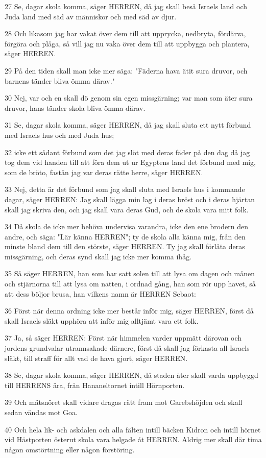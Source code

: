 \par 27 Se, dagar skola komma, säger HERREN, då jag skall beså Israels land och Juda land med säd av människor och med säd av djur.
\par 28 Och likasom jag har vakat över dem till att upprycka, nedbryta, fördärva, förgöra och plåga, så vill jag nu vaka över dem till att uppbygga och plantera, säger HERREN.
\par 29 På den tiden skall man icke mer säga: "Fäderna hava ätit sura druvor, och barnens tänder bliva ömma därav."
\par 30 Nej, var och en skall dö genom sin egen missgärning; var man som äter sura druvor, hans tänder skola bliva ömma därav.
\par 31 Se, dagar skola komma, säger HERREN, då jag skall sluta ett nytt förbund med Israels hus och med Juda hus;
\par 32 icke ett sådant förbund som det jag slöt med deras fäder på den dag då jag tog dem vid handen till att föra dem ut ur Egyptens land det förbund med mig, som de bröto, fastän jag var deras rätte herre, säger HERREN.
\par 33 Nej, detta är det förbund som jag skall sluta med Israels hus i kommande dagar, säger HERREN: Jag skall lägga min lag i deras bröst och i deras hjärtan skall jag skriva den, och jag skall vara deras Gud, och de skola vara mitt folk.
\par 34 Då skola de icke mer behöva undervisa varandra, icke den ene brodern den andre, och säga: "Lär känna HERREN"; ty de skola alla känna mig, från den minste bland dem till den störste, säger HERREN. Ty jag skall förlåta deras missgärning, och deras synd skall jag icke mer komma ihåg.
\par 35 Så säger HERREN, han som har satt solen till att lysa om dagen och månen och stjärnorna till att lysa om natten, i ordnad gång, han som rör upp havet, så att dess böljor brusa, han vilkens namn är HERREN Sebaot:
\par 36 Först när denna ordning icke mer består inför mig, säger HERREN, först då skall Israels släkt upphöra att inför mig alltjämt vara ett folk.
\par 37 Ja, så säger HERREN: Först när himmelen varder uppmätt därovan och jordens grundvalar utrannsakade därnere, först då skall jag förkasta all Israels släkt, till straff för allt vad de hava gjort, säger HERREN.
\par 38 Se, dagar skola komma, säger HERREN, då staden åter skall varda uppbyggd till HERRENS ära, från Hananeltornet intill Hörnporten.
\par 39 Och mätsnöret skall vidare dragas rätt fram mot Garebshöjden och skall sedan vändas mot Goa.
\par 40 Och hela lik- och askdalen och alla fälten intill bäcken Kidron och intill hörnet vid Hästporten österut skola vara helgade åt HERREN. Aldrig mer skall där tima någon omstörtning eller någon förstöring.

